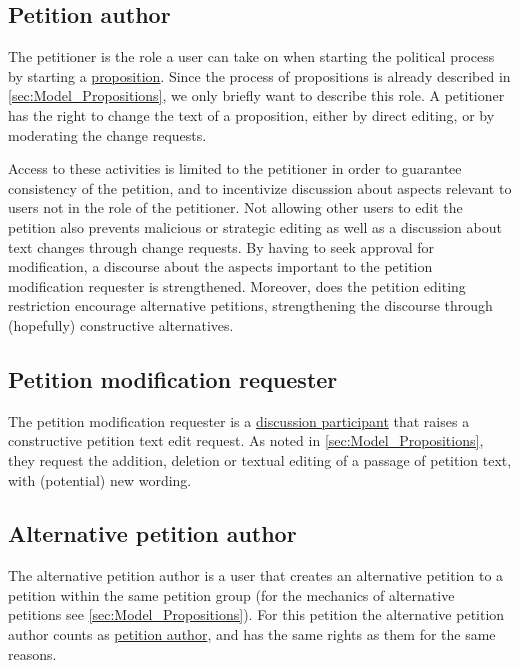 \subsection{Petition author}
\label{ssec:Roles_Petitioner}
The petitioner is the role a user can take on when starting the political process by starting a \href{ssec:Model_Propositions}{proposition}. Since the process of propositions is already described in \ref{sec:Model_Propositions}, we only briefly want to describe this role. A petitioner has the right to change the text of a proposition, either by direct editing, or by moderating the change requests. 

Access to these activities is limited to the petitioner in order to guarantee consistency of the petition, and to incentivize discussion about aspects relevant to users not in the role of the petitioner. Not allowing other users to edit the petition also prevents malicious or strategic editing as well as a discussion about text changes through change requests. By having to seek approval for modification, a discourse about the aspects important to the petition modification requester is strengthened.
Moreover, does the petition editing restriction encourage alternative petitions, strengthening the discourse through (hopefully) constructive alternatives.

\subsection{Petition modification requester}
The petition modification requester is a \href{sssec:Roles_DiscussionParticipant}{discussion participant} that raises a constructive petition text edit request. 
As noted in \ref{sec:Model_Propositions}, they request the addition, deletion or textual editing of a passage of petition text, with (potential) new wording. 

\subsection{Alternative petition author}
The alternative petition author is a user that creates an alternative petition to a petition within the same petition group (for the mechanics of alternative petitions see \ref{sec:Model_Propositions}). For this petition the alternative petition author counts as \href{sssec:Roles_Petitioner}{petition author}, and has the same rights as them for the same reasons.

